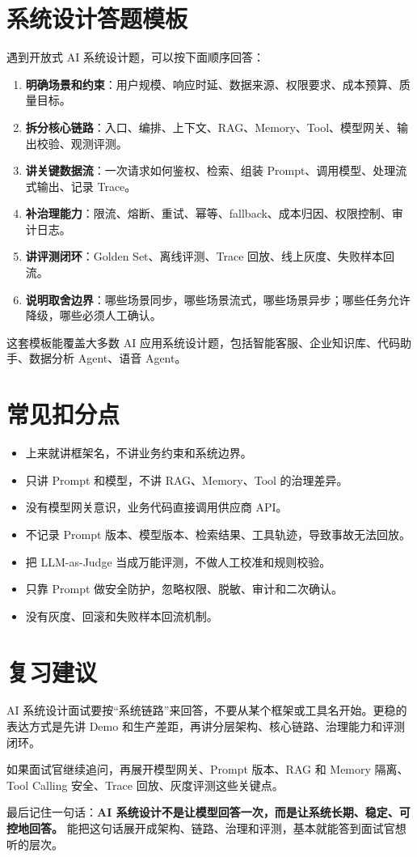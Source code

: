\documentclass[9pt,a4paper,twocolumn]{ctexart}
\begin{document}
\section*{系统设计答题模板}


遇到开放式 AI 系统设计题，可以按下面顺序回答：


\begin{enumerate}[itemsep=1pt, topsep=2pt]
  \item \textbf{明确场景和约束}：用户规模、响应时延、数据来源、权限要求、成本预算、质量目标。
  \item \textbf{拆分核心链路}：入口、编排、上下文、RAG、Memory、Tool、模型网关、输出校验、观测评测。
  \item \textbf{讲关键数据流}：一次请求如何鉴权、检索、组装 Prompt、调用模型、处理流式输出、记录 Trace。
  \item \textbf{补治理能力}：限流、熔断、重试、幂等、fallback、成本归因、权限控制、审计日志。
  \item \textbf{讲评测闭环}：Golden Set、离线评测、Trace 回放、线上灰度、失败样本回流。
  \item \textbf{说明取舍边界}：哪些场景同步，哪些场景流式，哪些场景异步；哪些任务允许降级，哪些必须人工确认。
\end{enumerate}


这套模板能覆盖大多数 AI 应用系统设计题，包括智能客服、企业知识库、代码助手、数据分析 Agent、语音 Agent。



\section*{常见扣分点}

\begin{itemize}[itemsep=1pt, topsep=2pt]
  \item 上来就讲框架名，不讲业务约束和系统边界。
  \item 只讲 Prompt 和模型，不讲 RAG、Memory、Tool 的治理差异。
  \item 没有模型网关意识，业务代码直接调用供应商 API。
  \item 不记录 Prompt 版本、模型版本、检索结果、工具轨迹，导致事故无法回放。
  \item 把 LLM-as-Judge 当成万能评测，不做人工校准和规则校验。
  \item 只靠 Prompt 做安全防护，忽略权限、脱敏、审计和二次确认。
  \item 没有灰度、回滚和失败样本回流机制。
\end{itemize}


\section*{复习建议}


AI 系统设计面试要按“系统链路”来回答，不要从某个框架或工具名开始。更稳的表达方式是先讲 Demo 和生产差距，再讲分层架构、核心链路、治理能力和评测闭环。



如果面试官继续追问，再展开模型网关、Prompt 版本、RAG 和 Memory 隔离、Tool Calling 安全、Trace 回放、灰度评测这些关键点。



最后记住一句话：\textbf{AI 系统设计不是让模型回答一次，而是让系统长期、稳定、可控地回答。} 能把这句话展开成架构、链路、治理和评测，基本就能答到面试官想听的层次。
\end{document}

